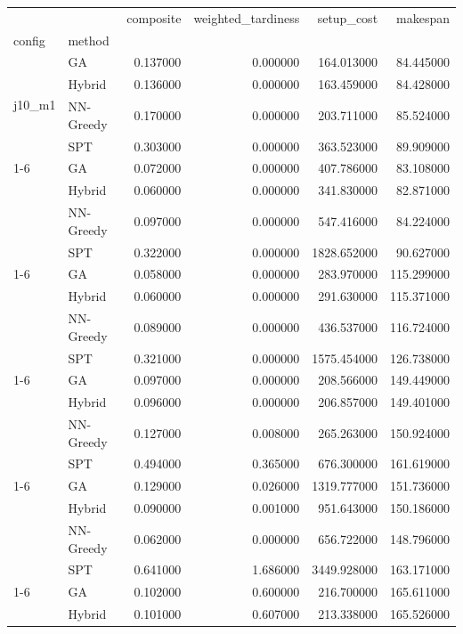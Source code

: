 \begin{tabular}{llrrrr}
\toprule
 &  & composite & weighted_tardiness & setup_cost & makespan \\
config & method &  &  &  &  \\
\midrule
\multirow[t]{4}{*}{j10_m1} & GA & 0.137000 & 0.000000 & 164.013000 & 84.445000 \\
 & Hybrid & 0.136000 & 0.000000 & 163.459000 & 84.428000 \\
 & NN-Greedy & 0.170000 & 0.000000 & 203.711000 & 85.524000 \\
 & SPT & 0.303000 & 0.000000 & 363.523000 & 89.909000 \\
\cline{1-6}
\multirow[t]{4}{*}{j10_m5} & GA & 0.072000 & 0.000000 & 407.786000 & 83.108000 \\
 & Hybrid & 0.060000 & 0.000000 & 341.830000 & 82.871000 \\
 & NN-Greedy & 0.097000 & 0.000000 & 547.416000 & 84.224000 \\
 & SPT & 0.322000 & 0.000000 & 1828.652000 & 90.627000 \\
\cline{1-6}
\multirow[t]{4}{*}{j14_m3} & GA & 0.058000 & 0.000000 & 283.970000 & 115.299000 \\
 & Hybrid & 0.060000 & 0.000000 & 291.630000 & 115.371000 \\
 & NN-Greedy & 0.089000 & 0.000000 & 436.537000 & 116.724000 \\
 & SPT & 0.321000 & 0.000000 & 1575.454000 & 126.738000 \\
\cline{1-6}
\multirow[t]{4}{*}{j18_m1} & GA & 0.097000 & 0.000000 & 208.566000 & 149.449000 \\
 & Hybrid & 0.096000 & 0.000000 & 206.857000 & 149.401000 \\
 & NN-Greedy & 0.127000 & 0.008000 & 265.263000 & 150.924000 \\
 & SPT & 0.494000 & 0.365000 & 676.300000 & 161.619000 \\
\cline{1-6}
\multirow[t]{4}{*}{j18_m5} & GA & 0.129000 & 0.026000 & 1319.777000 & 151.736000 \\
 & Hybrid & 0.090000 & 0.001000 & 951.643000 & 150.186000 \\
 & NN-Greedy & 0.062000 & 0.000000 & 656.722000 & 148.796000 \\
 & SPT & 0.641000 & 1.686000 & 3449.928000 & 163.171000 \\
\cline{1-6}
\multirow[t]{4}{*}{j20_m1} & GA & 0.102000 & 0.600000 & 216.700000 & 165.611000 \\
 & Hybrid & 0.101000 & 0.607000 & 213.338000 & 165.526000 \\

\end{tabular}
